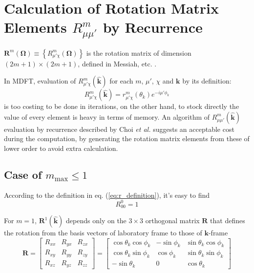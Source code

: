 
\chapter{Calculation of Rotation Matrix Elements $R_{\mu\mu'}^{m}$ by Recurrence\label{chpt:rotM-by-recurrence}}

$\mathbf{R}^{m}(\mathbf{\Omega})\equiv\left\{ R_{\mu'\chi}^{m}(\mathbf{\Omega})\right\} $
is the rotation matrix of dimension $\left(2m+1\right)\times\left(2m+1\right)$,
defined in Messiah, etc. \citep{Edmonds,Gray-Gubbins,Messiah}.

In MDFT, evaluation of $R_{\mu'\chi}^{m}(\hat{\mathbf{k}})$ for each
$m$, $\mu'$, $\chi$ and $\mathbf{k}$ by its definition:
\begin{equation}
R_{\mu'\chi}^{m}(\hat{\mathbf{k}})=r_{\mu'\chi}^{m}(\theta_{k})e^{-i\mu'\phi_{k}}\label{eq:r_definition}
\end{equation}
is too costing to be done in iterations, on the other hand, to stock
directly the value of every element is heavy in terms of memory. An
algorithm of $R_{\mu\mu'}^{m}(\hat{\mathbf{k}})$ evaluation by recurrence
described by Choi \textit{et al.} \citep{Choi_1999} suggests an acceptable
cost during the computation, by generating the rotation matrix elements
from these of lower order to avoid extra calculation.


\section{Case of $m_{\mathrm{max}}\leq1$}

According to the definition in eq. (\ref{eq:r_definition}), it's
easy to find
\begin{equation}
R_{00}^{0}=1
\end{equation}


For $m=1$, $\mathbf{R}^{1}(\hat{\mathbf{k}})$ depends only on the
$3\times3$ orthogonal matrix $\mathbf{R}$ that defines the rotation
from the basis vectors of laboratory frame to those of $\mathbf{k}$-frame
\begin{equation}
\mathbf{R}=\left[\begin{array}{ccc}
R_{xx} & R_{yx} & R_{zx}\\
R_{xy} & R_{yy} & R_{zy}\\
R_{xz} & R_{yz} & R_{zz}
\end{array}\right]=\left[\begin{array}{ccc}
\cos\theta_{k}\cos\phi_{k} & -\sin\phi_{k} & \sin\theta_{k}\cos\phi_{k}\\
\cos\theta_{k}\sin\phi_{k} & \cos\phi_{k} & \sin\theta_{k}\sin\phi_{k}\\
-\sin\theta_{k} & 0 & \cos\theta_{k}
\end{array}\right]
\end{equation}


